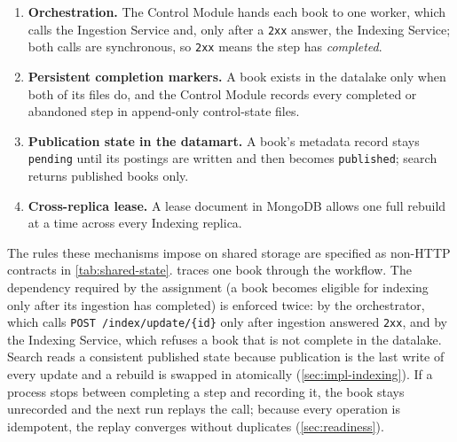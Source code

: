 \documentclass[10pt,a4paper]{article}
\newcommand{\code}[1]{\texttt{#1}}
\newcommand{\route}[1]{\texttt{#1}}
\begin{document}
\begin{enumerate}
  \item \textbf{Orchestration.} The Control Module hands each book to one
  worker, which calls the Ingestion Service and, only after a \code{2xx}
  answer, the Indexing Service; both calls are synchronous, so \code{2xx}
  means the step has \emph{completed}.
  \item \textbf{Persistent completion markers.} A book exists in the datalake
  only when both of its files do, and the Control Module records every
  completed or abandoned step in append-only control-state files.
  \item \textbf{Publication state in the datamart.} A book's metadata record
  stays \code{pending} until its postings are written and then becomes
  \code{published}; search returns published books only.
  \item \textbf{Cross-replica lease.} A lease document in MongoDB allows one
  full rebuild at a time across every Indexing replica.
\end{enumerate}

The rules these mechanisms impose on shared storage are specified as
non-HTTP contracts in \cref{tab:shared-state}.  traces one
book through the workflow. The dependency required by the assignment (a book
becomes eligible for indexing only after its ingestion has completed) is
enforced twice: by the orchestrator, which calls
\route{POST /index/update/\{id\}} only after ingestion answered \code{2xx},
and by the Indexing Service, which refuses a book that is not complete in the
datalake. Search reads a consistent published state because publication is the
last write of every update and a rebuild is swapped in atomically
(\cref{sec:impl-indexing}). If a process stops between completing a step and
recording it, the book stays unrecorded and the next run replays the call;
because every operation is idempotent, the replay converges without
duplicates (\cref{sec:readiness}).
\end{document}
